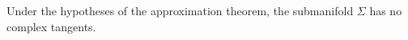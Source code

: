 
Under the hypotheses of the approximation theorem, the submanifold $\Sigma$ has no complex tangents.
